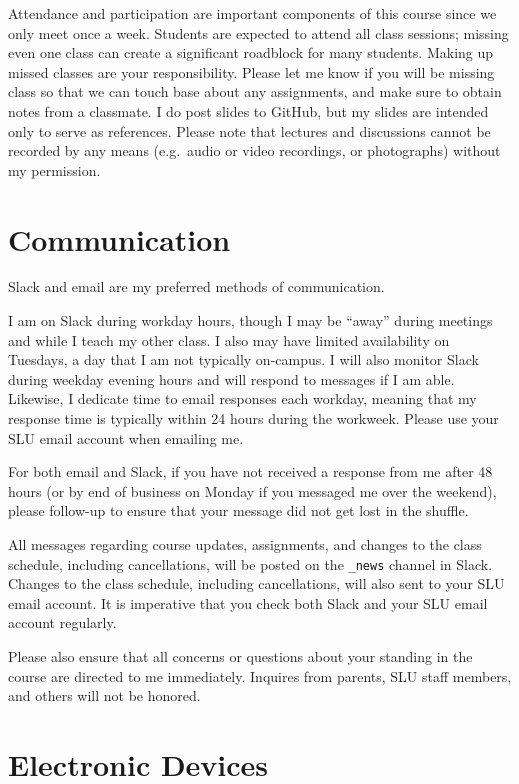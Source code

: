\documentclass[]{book}
\theoremstyle{definition}
\theoremstyle{definition}
\theoremstyle{definition}
\theoremstyle{remark}
\begin{document}
Attendance and participation are important components of this course
since we only meet once a week. Students are expected to attend all
class sessions; missing even one class can create a significant
roadblock for many students. Making up missed classes are your
responsibility. Please let me know if you will be missing class so that
we can touch base about any assignments, and make sure to obtain notes
from a classmate. I do post slides to GitHub, but my slides are intended
only to serve as references. Please note that lectures and discussions
cannot be recorded by any means (e.g.~audio or video recordings, or
photographs) without my permission.

\section{Communication}\label{communication}

Slack and email are my preferred methods of communication.

I am on Slack during workday hours, though I may be ``away'' during
meetings and while I teach my other class. I also may have limited
availability on Tuesdays, a day that I am not typically on-campus. I
will also monitor Slack during weekday evening hours and will respond to
messages if I am able. Likewise, I dedicate time to email responses each
workday, meaning that my response time is typically within 24 hours
during the workweek. Please use your SLU email account when emailing me.

For both email and Slack, if you have not received a response from me
after 48 hours (or by end of business on Monday if you messaged me over
the weekend), please follow-up to ensure that your message did not get
lost in the shuffle.

All messages regarding course updates, assignments, and changes to the
class schedule, including cancellations, will be posted on the
\texttt{\_news} channel in Slack. Changes to the class schedule,
including cancellations, will also sent to your SLU email account. It is
imperative that you check both Slack and your SLU email account
regularly.

Please also ensure that all concerns or questions about your standing in
the course are directed to me immediately. Inquires from parents, SLU
staff members, and others will not be honored.

\section{Electronic Devices}\label{electronic-devices}
\end{document}
